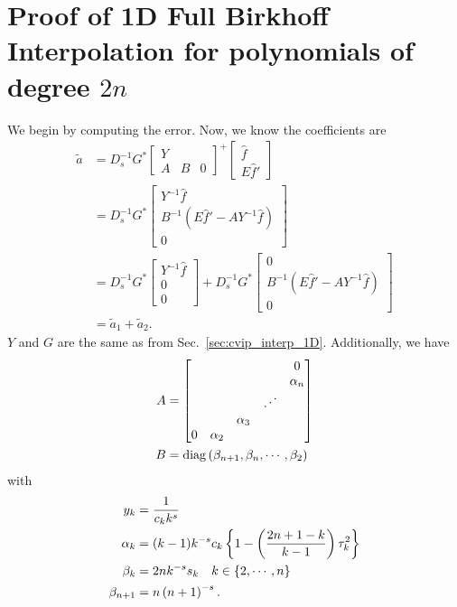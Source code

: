\section{Proof of 1D Full Birkhoff Interpolation for polynomials of degree $2n$}
\label{sec:cvip_birkhoff_full_1D}

We begin by computing the error. Now, we know the coefficients are
%
\begin{align}
    \tilde{a} &= D_{s}^{-1}G^{*} \begin{bmatrix}Y&\\A&B&0\end{bmatrix}^{+}
        \begin{bmatrix} \hat{f} \\ E\hat{f}' \end{bmatrix} \nonumber\\
    &= D_{s}^{-1}G^{*}\begin{bmatrix} Y^{-1}\hat{f} \\
        B^{-1}(E\hat{f}' - AY^{-1}\hat{f}) \\ 0\end{bmatrix} \nonumber\\
    &= D_{s}^{-1}G^{*}\begin{bmatrix} Y^{-1}\hat{f} \\ 0 \\ 0 \end{bmatrix}
        + D_{s}^{-1}G^{*} \begin{bmatrix} 0 \\
        B^{-1}(E\hat{f}' - AY^{-1}\hat{f}) \\ 0\end{bmatrix} \nonumber\\
    &= \tilde{a}_{1} + \tilde{a}_{2}.
    \label{eq:cvip_birkhoff_full_msn_total_terms}
\end{align}
%
$Y$ and $G$ are the same as from Sec.~\ref{sec:cvip_interp_1D}.
Additionally, we have
%
\begin{align}
    A &= \begin{bmatrix}
        & & & & 0 \\
        & & & & \alpha_{n} \\
        & & & \iddots & \\
        & & \alpha_{3} & & \\
        0 & \alpha_{2} & & & \\
        \end{bmatrix}
            \nonumber\\
    B &= \operatorname{diag}\left( \beta_{n+1},\beta_{n},\cdots,\beta_{2} \right)
\end{align}
%
with
%
\begin{align}
    y_{k} &= \frac{1}{c_{k}k^{s}} \nonumber\\
    \alpha_{k} &= (k-1)k^{-s}c_{k}\left\{ 1-\left( \frac{2n+1-k}{k-1} \right)
        \tau_{k}^{2} \right\}
        \nonumber\\
    \beta_{k} &= 2nk^{-s}s_{k} \quad k\in\left\{ 2,\cdots,n \right\} \nonumber\\
    \beta_{n+1} &= n\left( n+1 \right)^{-s}.
\end{align}
%



